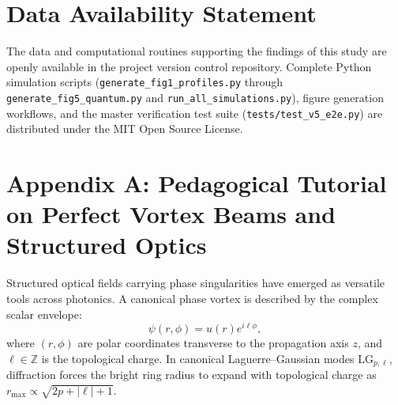 \documentclass[11pt,a4paper]{article}
\begin{document}
\section*{Data Availability Statement}
The data and computational routines supporting the findings of this study are openly available in the project version control repository. Complete Python simulation scripts (\texttt{generate\_fig1\_profiles.py} through \texttt{generate\_fig5\_quantum.py} and \texttt{run\_all\_simulations.py}), figure generation workflows, and the master verification test suite (\texttt{tests/test\_v5\_e2e.py}) are distributed under the MIT Open Source License.


\appendix

\section{Appendix A: Pedagogical Tutorial on Perfect Vortex Beams and Structured Optics}
\label{app:primer}

Structured optical fields carrying phase singularities have emerged as versatile tools across photonics. A canonical phase vortex is described by the complex scalar envelope:
\begin{equation}
\psi(r, \phi) = u(r) e^{i \ell \phi},
\label{eq:app_vortex_ansatz}
\end{equation}
where $(r, \phi)$ are polar coordinates transverse to the propagation axis $z$, and $\ell \in \mathbb{Z}$ is the topological charge. In canonical Laguerre--Gaussian modes $\text{LG}_{p, \ell}$, diffraction forces the bright ring radius to expand with topological charge as $r_{\max} \propto \sqrt{2p + |\ell| + 1}$.
\end{document}
